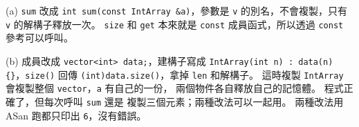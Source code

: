 \begin{enumerate}
(a) \texttt{sum} 改成 \texttt{int sum(const IntArray \&a)}，參數是
\texttt{v} 的別名，不會複製，只有 \texttt{v} 的解構子釋放一次。
\texttt{size} 和 \texttt{get} 本來就是 \texttt{const} 成員函式，所以透過
\texttt{const} 參考可以呼叫。

(b) 成員改成 \texttt{vector<int> data;}，建構子寫成
\texttt{IntArray(int n) : data(n) \{\}}，\texttt{size()} 回傳
\texttt{(int)data.size()}，拿掉 \texttt{len} 和解構子。 這時複製
\texttt{IntArray} 會複製整個 \texttt{vector}，\texttt{a} 有自己的一份，
兩個物件各自釋放自己的記憶體。 程式正確了，但每次呼叫 \texttt{sum} 還是
複製三個元素；兩種改法可以一起用。
兩種改法用 ASan 跑都只印出 \texttt{6}，沒有錯誤。
\end{enumerate}
